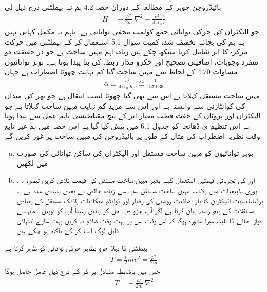 ہائیڈروجن جوہر کے مطالعہ کے دوران حصہ 4.2 ہم نے   ہیملٹنی  درج ذیل لی 
\begin{align}
H = - \frac{\hslash^2}{2m} \nabla^2 - \frac{e^2}{4 \pi \epsilon_0} \frac{1}{r}
\end{align}
جو الیکٹران کی حرکی توانائی جمع کولمب مخفی توانائی ہے۔ تاہم یہ مکمل کہانی نہیں ہے ہم  کی بجائے تخفیف   شدہ  کمیت سوال 5.1 استعمال  کر کے  ہیملٹنی میں حرکت مرکزہ کا اثر شامل  کرنا سیکھ چکے ہیں زیادہ اہم مہین ساخت ہے جو در حقیقت دو منفرد وجوہات،  اضافیتی تصحیح اور چکرو مدار   ربط،  کی بنا پیدا ہوتا ہے۔ بوہر توانائیوں مساوات 4.70 کے لحاظ سے مہین ساخت  گنا کم  نہایت چھوٹا اضطراب ہے جہاں 
\begin{align}
\alpha \equiv \frac{e^2}{4 \pi \epsilon_0 \hslash c} \cong \frac{1}{137.036}
\end{align} 
مہین ساخت مستقل کہلاتا ہے اس سے بھی  گنا چھوٹا  لیمب انتقال ہے جو بھر کی میدان کی کوانٹازنی سے وابستہ ہے اور اس سے مزید کم نہایت مہین ساخت کہلاتا ہے جو الیکٹران اور پروٹان کے جفت قطب  معیار اثر کے بیچ مقناطیسی باہم عمل سے پیدا ہوتا ہے اس   تنظیم ی  ڈھانچہ کو جدول 6.1 میں پیش کیا گیا ہے اس حصہ میں ہم غیر تابع  وقت نظریہ اضطراب کی مثال کے طور پر ہائیڈروجن کی مہین ساخت پر غور کریں گے 
\begin{enumerate}[a.]
\item
بوہر توانائیوں کو مہین ساخت مستقل اور الیکٹران کی ساکن توانائی  کی صورت میں لکھیں 
\item
{}، ،  اور  کی تجرباتی قیمتیں  استعمال کیے بغیر مہین ساخت مستقل کی قیمت تلاش کریں تبصرہ پوری طبیعیات میں بلاشبہ مہین ساخت مستقل سب سے زیادہ خالص بے بعدی  بنیادی عدد ہے یہ برقناطیسیت  الیکٹران کا بار اضافیت روشنی کی رفتار اور کوانٹم میکانیات پلانک مستقل کے بنیادی مستقلات کے بیچ رشتہ بیان کرتا ہے اگر آپ جزو -ب حل کر پائیں  یقیناً   آپ کو نوبیل انعام سے نوازا جائے گا البتہ میرا مشورہ ہوگا کہ اس وقت اس پر بہت وقت ضائع نہ کریں بہت سارے انتہائی قابل لوگ ایسا  کر کے  ناکام ہو چکے ہیں  
\end{enumerate}
ہیملٹنی کا پہلا جزو بظاہر حرکی توانائی کو ظاہر کرتا ہے 
\begin{align}
T = \frac{1}{2} mv^2 = \frac{p^2}{2m} 
\end{align}
جس میں باضابطہ متبادل  پر کر کے درج ذیل عامل حاصل ہوگا 
\begin{align}
T = - \frac{\hslash^2}{2m} \nabla^2
\end{align} 
